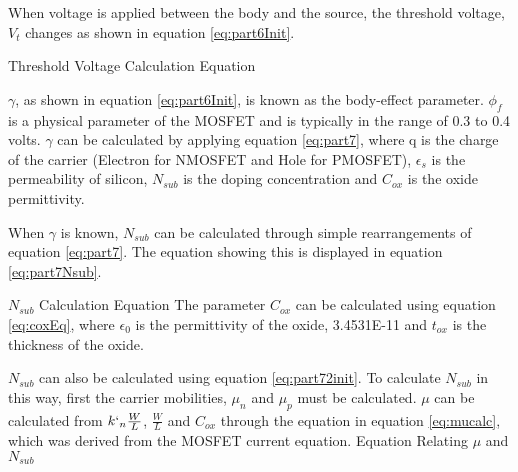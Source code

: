 When voltage is applied between the body and the source, the threshold voltage, $V_t$ changes as shown in equation \ref{eq:part6Init}.

	{Threshold Voltage Calculation Equation}


$\gamma$, as shown in equation \ref{eq:part6Init}, is known as the body-effect parameter. $\phi_f$ is a physical parameter of the MOSFET and is typically in the range of 0.3 to 0.4 volts. 
$\gamma$ can be calculated by applying equation \ref{eq:part7}, where q is the charge of the carrier (Electron for NMOSFET and Hole for PMOSFET), $\epsilon_s$ is the permeability of silicon, $N_{sub}$ is the doping concentration and $C_{ox}$ is the oxide permittivity.  


When $\gamma$ is known, $N_{sub}$ can be calculated through simple rearrangements of equation \ref{eq:part7}. The equation showing this is displayed in equation \ref{eq:part7Nsub}. 

	{$N_{sub}$ Calculation Equation}
The parameter $C_{ox}$ can be calculated using equation \ref{eq:coxEq}, where $\epsilon_0$ is the permittivity of the oxide, 3.4531E-11 and $t_{ox}$ is the thickness of the oxide. 



$N_{sub}$ can also be calculated using equation \ref{eq:part72init}. To calculate $N_{sub}$ in this way, first the carrier mobilities, $\mu_n$ and $\mu_p$ must be calculated. $\mu$ can be calculated from $k`_n \frac{W}{L}$, $\frac{W}{L}$ and $C_{ox}$ through the equation in equation \ref{eq:mucalc}, which was derived from the MOSFET current equation. 
	{Equation Relating $\mu$ and $N_{sub}$}


